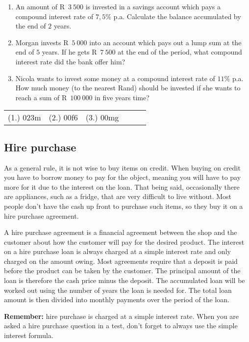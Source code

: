 \begin{exercises}{}{
    \begin{enumerate}[label=\textbf{\arabic*}.]
	\item An amount of R~$3~500$ is invested in a savings account which pays a compound interest rate of $7,5\%$ p.a. Calculate the balance accumulated by the end of $2$ years.

	\item Morgan invests R~$5~000$ into an account which pays out a lump sum at the end of $5$ years. If he gets R~$7~500$ at the end of the period, what compound interest rate did the bank offer him?

	\item Nicola wants to invest some money at a compound interest rate of $11\%$ p.a. How much money (to the nearest Rand) should be invested if she wants to reach a sum of R~$100~000$ in five years time?\\
    \end{enumerate}
\practiceinfo

\begin{tabular}[h]{cccccc}
	(1.) 023m &	(2.) 00f6&	(3.) 00mg
    \end{tabular}
}
\end{exercises}


\subsection{Hire purchase}

As a general rule, it is not wise to buy items on credit. When buying
on credit you have to borrow money to pay for the object, meaning you
will have to pay more for it due to the interest on the loan. That
being said, occasionally there are appliances, such as a fridge, that
are very difficult to live without. Most people don't have the cash up
front to purchase such items, so they buy it on a hire purchase
agreement.

A hire purchase agreement is a financial agreement between the shop
and the customer about how the customer will pay for the desired
product. The interest on a hire purchase loan is always charged at a
simple interest rate and only charged on the amount owing. Most
agreements require that a deposit is paid before the product can be
taken by the customer. The principal amount of the loan is therefore
the cash price minus the deposit. The accumulated loan will be worked
out using the number of years the loan is needed for. The total loan
amount is then divided into monthly payments over the period of the
loan.
\par
\textbf{Remember:} hire purchase is charged at a simple interest rate. When you are asked a hire purchase question in a test, don't forget to always use the simple interest formula.

